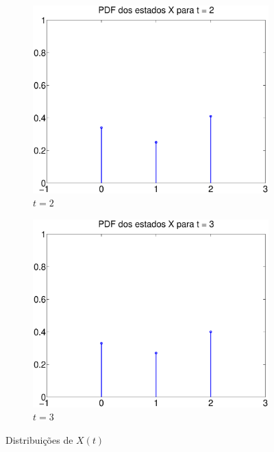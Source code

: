 \documentclass{report}
\begin{document}
\begin{figure}[H]
\begin{subfigure}{0.4\textwidth}
		\includegraphics[width = \textwidth]{Q1_d_pdf_x_2}
		\caption{$t = 2$}
	\end{subfigure}
	\begin{subfigure}{0.4\textwidth}
		\centering
		\includegraphics[width = \textwidth]{Q1_d_pdf_x_3}
		\caption{$t = 3$}
	\end{subfigure}
	\caption{Distribuições de $X(t)$}
	\label{pdfs_estados}
\end{figure}
\end{document}
